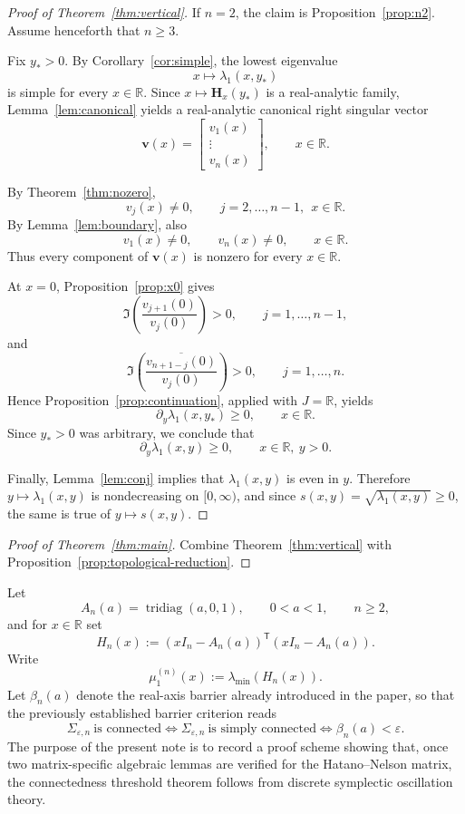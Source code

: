 \documentclass[11pt]{article}
\numberwithin{equation}{section}
\begin{document}
\begin{proof}[Proof of Theorem~\ref{thm:vertical}]
If $n=2$, the claim is Proposition~\ref{prop:n2}.  Assume henceforth that
$n\ge3$.

Fix $y_*>0$.  By Corollary~\ref{cor:simple}, the lowest eigenvalue
\[
x\longmapsto \lambda_1(x,y_*)
\]
is simple for every $x\in\mathbb{R}$.  Since $x\mapsto \mathbf H_x(y_*)$ is a
real-analytic family, Lemma~\ref{lem:canonical} yields a real-analytic
canonical right singular vector
\[
\bm v(x)=
\begin{bmatrix}
v_1(x)\\
\vdots\\
v_n(x)
\end{bmatrix},
\qquad
x\in\mathbb{R}.
\]

By Theorem~\ref{thm:nozero},
\[
v_j(x)\neq0,
\qquad
j=2,\dots,n-1,\ \ x\in\mathbb{R}.
\]
By Lemma~\ref{lem:boundary}, also
\[
v_1(x)\neq0,
\qquad
v_n(x)\neq0,
\qquad
x\in\mathbb{R}.
\]
Thus every component of $\bm v(x)$ is nonzero for every $x\in\mathbb{R}$.

At $x=0$, Proposition~\ref{prop:x0} gives
\[
\Im\!\left(\frac{v_{j+1}(0)}{v_j(0)}\right)>0,
\qquad
j=1,\dots,n-1,
\]
and
\[
\Im\!\left(\frac{\overline{v_{n+1-j}(0)}}{v_j(0)}\right)>0,
\qquad
j=1,\dots,n.
\]
Hence Proposition~\ref{prop:continuation}, applied with $J=\mathbb{R}$, yields
\[
\partial_y\lambda_1(x,y_*)\ge0,
\qquad
x\in\mathbb{R}.
\]
Since $y_*>0$ was arbitrary, we conclude that
\[
\partial_y\lambda_1(x,y)\ge0,
\qquad
x\in\mathbb{R},\ y>0.
\]

Finally, Lemma~\ref{lem:conj} implies that $\lambda_1(x,y)$ is even in $y$.
Therefore $y\mapsto \lambda_1(x,y)$ is nondecreasing on $[0,\infty)$, and
since $s(x,y)=\sqrt{\lambda_1(x,y)}\ge0$, the same is true of $y\mapsto s(x,y)$.
\end{proof}

\begin{proof}[Proof of Theorem~\ref{thm:main}]
Combine Theorem~\ref{thm:vertical} with
Proposition~\ref{prop:topological-reduction}.
\end{proof}


Let
\[
A_n(a)=\operatorname{tridiag}(a,0,1),\qquad 0<a<1,\qquad n\ge 2,
\]
and for \(x\in\mathbb R\) set
\[
H_n(x):=(xI_n-A_n(a))^{\mathsf T}(xI_n-A_n(a)).
\]
Write
\[
\mu_1^{(n)}(x):=\lambda_{\min}(H_n(x)).
\]
Let \(\beta_n(a)\) denote the real-axis barrier already introduced in the paper, so that the
previously established barrier criterion reads
\[
\Sigma_{\varepsilon,n}\ \text{is connected}
\iff
\Sigma_{\varepsilon,n}\ \text{is simply connected}
\iff
\beta_n(a)<\varepsilon.
\]
The purpose of the present note is to record a proof scheme showing that, once two
matrix-specific algebraic lemmas are verified for the Hatano--Nelson matrix, the connectedness
threshold theorem follows from discrete symplectic oscillation theory.
\end{document}
